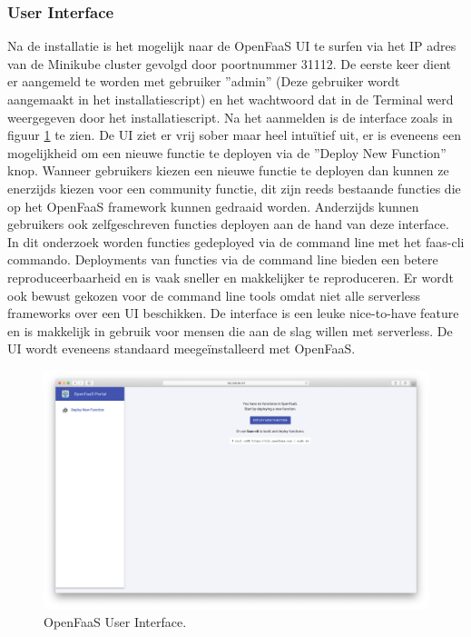 \subsubsection{User Interface}
Na de installatie is het mogelijk naar de OpenFaaS UI te surfen via het IP adres van de Minikube cluster gevolgd door poortnummer 31112.
De eerste keer dient er aangemeld te worden met gebruiker ''admin'' (Deze gebruiker wordt aangemaakt in het installatiescript) en het wachtwoord dat in de Terminal werd weergegeven door het installatiescript. Na het aanmelden is de interface zoals in figuur \ref{fig:openfaas-ui} te zien. De UI ziet er vrij sober maar heel intuïtief uit, er is eveneens een mogelijkheid om een nieuwe functie te deployen via de ''Deploy New Function'' knop. Wanneer gebruikers kiezen een nieuwe functie te deployen dan kunnen ze enerzijds kiezen voor een community functie, dit zijn reeds bestaande functies die op het OpenFaaS framework kunnen gedraaid worden. Anderzijds kunnen gebruikers ook zelfgeschreven functies deployen aan de hand van deze interface. In dit onderzoek worden functies gedeployed via de command line met het faas-cli commando. Deployments van functies via de command line bieden een betere reproduceerbaarheid en is vaak sneller en makkelijker te reproduceren. Er wordt ook bewust gekozen voor de command line tools omdat niet alle serverless frameworks over een UI beschikken. De interface is een leuke nice-to-have feature en is makkelijk in gebruik voor mensen die aan de slag willen met serverless. De UI wordt eveneens standaard meegeïnstalleerd met OpenFaaS.
\begin{figure}
    \includegraphics[width=1\textwidth]{img/openfaas-ui.png}
    \caption{OpenFaaS User Interface.}
    \label{fig:openfaas-ui}  
\end{figure}

